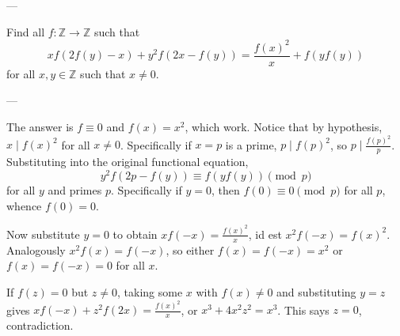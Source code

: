 
---

Find all $f:\mathbb Z\to\mathbb Z$ such that \[xf(2f(y)-x)+y^2f(2x-f(y))=\frac{f(x)^2}x+f(yf(y))\]
for all $x,y\in\mathbb Z$ such that $x\ne0$.

---

The answer is $f\equiv0$ and $f(x)=x^2$, which work. Notice that by hypothesis, $x\mid f(x)^2$ for all $x\ne0$. Specifically if $x=p$ is a prime, $p\mid f(p)^2$, so $p\mid\frac{f(p)^2}p$. Substituting into the original functional equation, \[y^2f(2p-f(y))\equiv f(yf(y))\pmod p\]
for all $y$ and primes $p$. Specifically if $y=0$, then $f(0)\equiv0\pmod p$ for all $p$, whence $f(0)=0$.

Now substitute $y=0$ to obtain $xf(-x)=\frac{f(x)^2}x$, id est $x^2f(-x)=f(x)^2$. Analogously $x^2f(x)=f(-x)$, so either $f(x)=f(-x)=x^2$ or $f(x)=f(-x)=0$ for all $x$.

If $f(z)=0$ but $z\ne0$, taking some $x$ with $f(x)\ne0$ and substituting $y=z$ gives $xf(-x)+z^2f(2x)=\frac{f(x)^2}x$, or $x^3+4x^2z^2=x^3$. This says $z=0$, contradiction.
